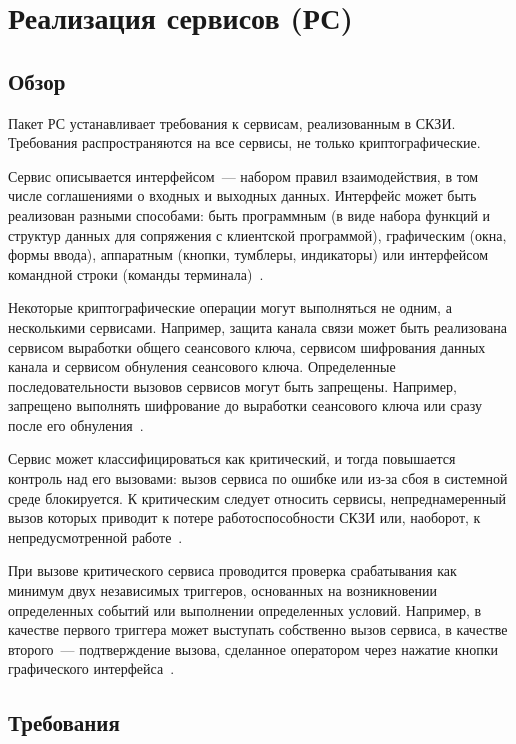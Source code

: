 \section{Реализация сервисов (РС)}\label{SV}

\subsection{Обзор}\label{SV.Intro}

Пакет РС устанавливает требования к сервисам, реализованным в СКЗИ.
%
Требования распространяются на все сервисы, не только криптографические.

Сервис описывается интерфейсом~--- набором правил взаимодействия,
в том числе соглашениями о входных и выходных данных.
%
Интерфейс может быть реализован разными способами:
%
быть программным (в виде набора функций и структур данных для сопряжения
с клиентской программой), графическим (окна, формы ввода),
аппаратным (кнопки, тумблеры, индикаторы)
или интерфейсом командной строки (команды терминала)~.

Некоторые криптографические операции могут выполняться не одним, а несколькими
сервисами. Например, защита канала связи может быть реализована сервисом
выработки общего сеансового ключа, сервисом шифрования данных канала и сервисом
обнуления сеансового ключа.
%
Определенные последовательности вызовов сервисов могут быть запрещены. Например,
запрещено выполнять шифрование до выработки сеансового ключа или сразу после его
обнуления~.

Сервис может классифицироваться как критический, и тогда повышается контроль над
его вызовами: вызов сервиса по ошибке или из-за сбоя в системной среде блокируется.
% 
К критическим следует относить сервисы, непреднамеренный вызов 
которых приводит к потере работоспособности СКЗИ или, наоборот, к
непредусмотренной работе~.

При вызове критического сервиса проводится проверка срабатывания как 
минимум двух независимых триггеров, основанных на возникновении 
определенных событий или выполнении определенных условий. 
%
Например, в качестве первого триггера может выступать собственно вызов сервиса, 
в качестве второго~--- подтверждение вызова, сделанное оператором через нажатие 
кнопки графического интерфейса~.

\subsection{Требования}\label{SV.Reqs}

